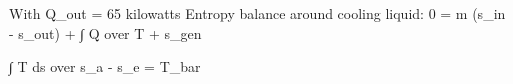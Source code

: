 With Q_out = 65 kilowatts  
Entropy balance around cooling liquid:  
0 = m (s_in - s_out) + ∫ Q over T + s_gen  

∫ T ds over s_a - s_e = T_bar